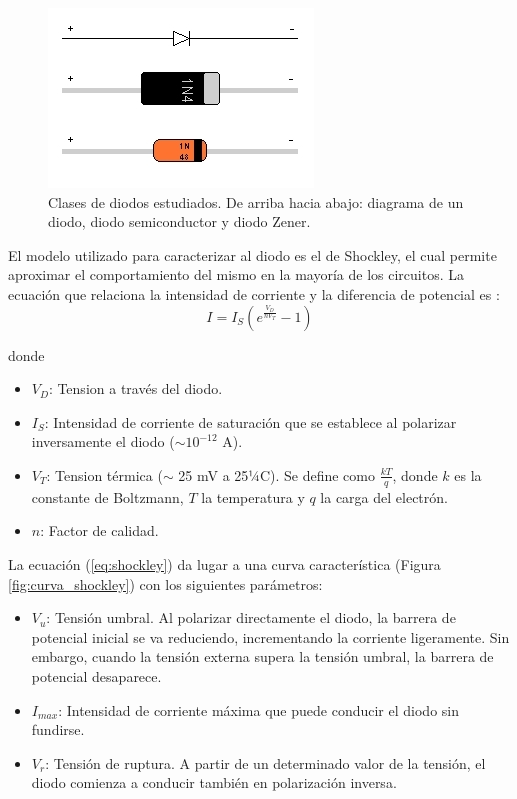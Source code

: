 \documentclass[twoside,twocolumn,a4paper]{article}
\begin{document}
\begin{figure}[h]
\includegraphics[width=\linewidth]{tipos_diodos.jpg}
\caption{Clases de diodos estudiados. De arriba hacia abajo: diagrama de un diodo, diodo semiconductor y diodo Zener.}
\label{fig:tipos_diodos}
\end{figure}

El modelo utilizado para caracterizar al diodo es el de Shockley, el cual permite aproximar el comportamiento del mismo en la mayor\'ia de los circuitos. La ecuaci\'on que relaciona la intensidad de corriente y la diferencia de potencial es \cite{eq:shockley}:
\begin{equation}
\label{eq:shockley}
I = I_{S}(e^\frac{V_{D}}{nV_{T}} - 1)
\end{equation}

donde

\begin{itemize}
\item 
$V_{D}$: Tension a trav\'es del diodo. 
\item 
$I_{S}$: Intensidad de corriente de saturaci\'on que se establece al polarizar inversamente el diodo ($\sim 10^{-12}$ A).
\item
$V_{T}$: Tension t\'ermica ($\sim$ 25 mV a 25¼C). Se define como $\frac{kT}{q}$, donde $k$ es la constante de Boltzmann, $T$ la temperatura y $q$ la carga del electr\'on.
\item
$n$: Factor de calidad.  
\end{itemize}

La ecuaci\'on (\ref{eq:shockley}) da lugar a una curva caracter\'istica (Figura \ref{fig:curva_shockley}) con los siguientes par\'ametros:

\begin{itemize}
\item 
$V_{u}$: Tensi\'on umbral. Al polarizar directamente el diodo, la barrera de potencial inicial se va reduciendo, incrementando la corriente ligeramente. Sin embargo, cuando la tensi\'on externa supera la tensi\'on umbral, la barrera de potencial desaparece.
\item 
$I_{max}$: Intensidad de corriente m\'axima que puede conducir el diodo sin fundirse.
\item
$V_{r}$: Tensi\'on de ruptura. A partir de un determinado valor de la tensi\'on, el diodo comienza a conducir tambi\'en en polarizaci\'on inversa. 
\end{itemize}
\end{document}
